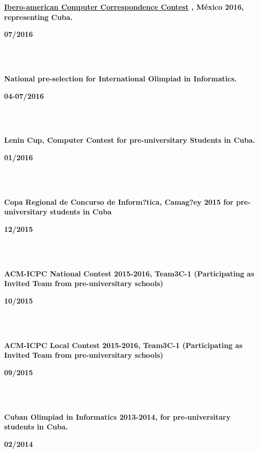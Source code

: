 \begin{minipage}{0.8\textwidth}
    \parbox{0.8\linewidth}{\textbf{\hyperref[sec:ibero]{Ibero-american Computer Correspondence Contest} , México 2016, representing  Cuba.}} \hfill \textbf{07/2016}\\
    \\
\end{minipage}\\
\begin{minipage}{0.8\textwidth}
    \parbox{0.8\linewidth}{\textbf{National pre-selection for International Olimpiad in Informatics.}} \hfill \textbf{04-07/2016}\\
    \\
\end{minipage}\\
\begin{minipage}{0.8\textwidth}
    \parbox{0.8\linewidth}{\textbf{Lenin Cup, Computer Contest for pre-universitary Students in Cuba.}} \hfill \textbf{01/2016}\\
    \\
\end{minipage}\\
\begin{minipage}{0.8\textwidth}
    \parbox{0.8\linewidth}{\textbf{Copa Regional de Concurso de Inform?tica, Camag?ey 2015 for pre-universitary students in Cuba}} \hfill \textbf{12/2015}\\
    \\
\end{minipage}\\
\begin{minipage}{0.8\textwidth}
    \parbox{0.8\linewidth}{\textbf{ACM-ICPC National Contest 2015-2016, Team3C-1 (Participating as  Invited Team from pre-universitary schools)}} \hfill \textbf{10/2015}\\
    \\
\end{minipage}\\
\begin{minipage}{0.8\textwidth}
    \parbox{0.8\linewidth}{\textbf{ACM-ICPC Local Contest 2015-2016, Team3C-1 (Participating as  Invited Team from pre-universitary schools)}} \hfill \textbf{09/2015}\\
    \\
\end{minipage}\\
\begin{minipage}{0.8\textwidth}
    \parbox{0.8\linewidth}{\textbf{Cuban Olimpiad in Informatics 2013-2014, for pre-universitary students in Cuba.}} \hfill \textbf{02/2014}\\
    \\
\end{minipage}\\